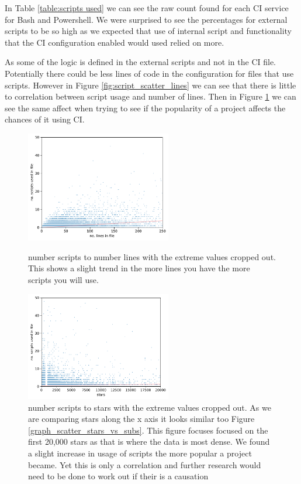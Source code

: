 \documentclass[10pt,conference]{IEEEtran}
\begin{document}
In Table \ref{table:scripts used} we can see the raw count found for each CI service for Bash and Powershell. We were surprised to see the percentages for external scripts to be so high as we expected that use of internal script and functionality that the CI configuration enabled would used relied on more.

\begin{table}
  
\end{table}

As some of the logic is defined in the external scripts and not in the CI file. Potentially there could be less lines of code in the configuration for files that use scripts. However in Figure \ref{fig:script_scatter_lines} we can see that there is little to correlation between script usage and number of lines. Then in Figure \ref{fig:script_scatter_lines2} we can see the same affect when trying to see if the popularity of a project affects the chances of it using CI.

\begin{figure}[!ht]
  \centering
  \begin{minipage}[!t]{.48\textwidth}
    \includegraphics[width=2.5in]{../src/results/scripts vs lines.pdf}
    \caption{number scripts to number lines with the extreme values cropped out. This shows a slight trend in the more lines you have the more scripts you will use.}
    \label{fig:script_scatter_lines}    
  \end{minipage}%
  \hfill
  \begin{minipage}[!t]{.48\textwidth}
    \includegraphics[width=2.5in]{../src/results/scripts vs stars.pdf}
    \caption{number scripts to stars with the extreme values cropped out. As we are comparing stars along the x axis it looks similar too Figure \ref{graph_scatter_stars_vs_subs}. This figure focuses focused on the first 20,000 stars as that is where the data is most dense. We found a slight increase in usage of scripts the more popular a project became. Yet this is only a correlation and further research would need to be done to work out if their is a causation}
    \label{fig:script_scatter_lines2}
  \end{minipage}
\end{figure}
\end{document}
